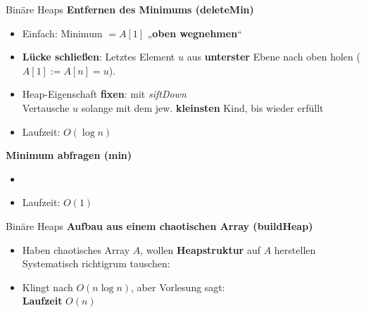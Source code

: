 \begin{frame}{Binäre Heaps}
	\textbf{Entfernen des Minimums (deleteMin)}
	\begin{itemize}
		\item Einfach: Minimum $= A[1]$ „\textbf{oben wegnehmen}“
		\pause
		\item \textbf{Lücke schließen}: Letztes Element $u$ aus \textbf{unterster} Ebene nach oben holen ($A[1] := A[n] = u$).
		\pause
		\item Heap-Eigenschaft \textbf{fixen}: mit \emph{siftDown} \\
		Vertausche $u$ solange mit dem jew. \textbf{kleinsten} Kind, bis wieder erfüllt
		\pause
		\item Laufzeit: $O(\log n)$
		\pause
	\end{itemize}
	\forcenewline
	\textbf{Minimum abfragen (min)}
	\begin{itemize}
		\item {}
		\item Laufzeit: $O(1)$
	\end{itemize}
\end{frame}

\begin{frame}{Binäre Heaps}
	\textbf{Aufbau aus einem chaotischen Array (buildHeap)} 
	\begin{itemize}
		\item Haben chaotisches Array $A$, wollen \textbf{Heapstruktur} auf $A$ herstellen
		\implitem Systematisch richtigrum tauschen: \\
		\quad {}
		\qquad {}
		\pause
		\item Klingt nach $O(n \log n)$, aber Vorlesung sagt: \\
		\textbf{Laufzeit} $O(n)$
	\end{itemize}
\end{frame}

\iffalse
\begin{frame}{Binäre Heaps}
	\textbf{Adressierbare Heaps} \\[0,125cm]
	\begin{itemize}
		\item Vorhaben: Ermögliche die Änderung des Wertes eines Elementes (d.h. nach der Wertänderung wird das Element an seine neue Position hoch- bzw. runtergetauscht)
		\pause
		\item Problem: Wenn Elemente ihre Position im Array (und somit im Speicher) ständig ändern, können sie nicht beständig adressiert werden
		\pause
		\item Lösung: Halte nicht die Elemente selbst, sondern Referenzen auf diese Elemente in der Datenstruktur
	\end{itemize}
\end{frame}
\fi

